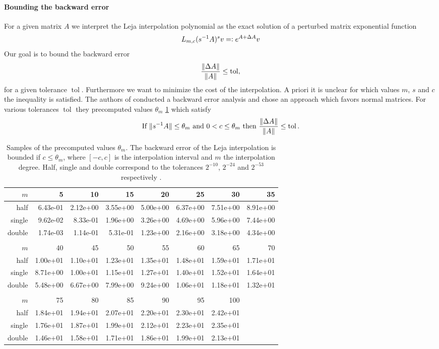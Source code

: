 \documentclass{scrartcl}
\newcommand{\eqdefn}{=\mathrel{\mathop:}}
\begin{document}
	\paragraph{Bounding the backward error} For a given matrix $A$ we interpret the Leja interpolation polynomial as the exact solution of a perturbed matrix exponential function
	\[
	L_{m,c}(s^{-1}A)^sv \eqdefn e^{A + \Delta A}v\\
	\]
	Our goal is to bound the backward error 
	\[
	\frac{\lVert\Delta A\rVert}{\lVert A\rVert} \le \operatorname{tol}, 
	\]
	for a given tolerance $\operatorname{tol}$. Furthermore we want to minimize the cost of the interpolation. A priori it is unclear for which values $m$, $s$ and $c$ the inequality is satisfied. The authors of \cite{lejarev} conducted a backward error analysis and chose an approach which favors normal matrices. For various tolerances $\operatorname{tol}$ they precomputed values $\theta_m$ \ref{table:thetam} which satisfy
	\[
	\text{If}\ \norm{s^{-1}A}\le \theta_m\ \text{and}\ 0 < c \le \theta_m\ \text{then}\ \frac{\norm{\Delta A}}{\norm{A}} \le \operatorname{tol}.
	\]
	\begin{table}[tbp]
		\begin{tabular}{r|rrrrrrr}
			$m$ &        5 &       10 &       15 &       20 &       25 &       30 &       35 \\\hline
			half & 6.43e-01 & 2.12e+00 & 3.55e+00 & 5.00e+00 & 6.37e+00 & 7.51e+00 & 8.91e+00 \\
			single & 9.62e-02 & 8.33e-01 & 1.96e+00 & 3.26e+00 & 4.69e+00 & 5.96e+00 & 7.44e+00 \\
			double & 1.74e-03 & 1.14e-01 & 5.31e-01 & 1.23e+00 & 2.16e+00 & 3.18e+00 & 4.34e+00 \\
			\\
			$m$ &       40 &       45 &       50 &       55 &       60 &       65 &       70 \\\hline
			half & 1.00e+01 & 1.10e+01 & 1.23e+01 & 1.35e+01 & 1.48e+01 & 1.59e+01 & 1.71e+01 \\
			single & 8.71e+00 & 1.00e+01 & 1.15e+01 & 1.27e+01 & 1.40e+01 & 1.52e+01 & 1.64e+01 \\
			double & 5.48e+00 & 6.67e+00 & 7.99e+00 & 9.24e+00 & 1.06e+01 & 1.18e+01 & 1.32e+01 \\
			\\
			$m$ &       75 &       80 &       85 &       90 &       95 &      100 \\ \hline
			half & 1.84e+01 & 1.94e+01 & 2.07e+01 & 2.20e+01 & 2.30e+01 & 2.42e+01 \\
			single & 1.76e+01 & 1.87e+01 & 1.99e+01 & 2.12e+01 & 2.23e+01 & 2.35e+01 \\
			double & 1.46e+01 & 1.58e+01 & 1.71e+01 & 1.86e+01 & 1.99e+01 & 2.13e+01
		\end{tabular}
		\caption{Samples of the precomputed values $\theta_m$. The backward error of the Leja interpolation is bounded if $c\le\theta_m$, where $[-c,c]$ is the interpolation interval and $m$ the interpolation degree. Half, single and double correspond to the tolerances $2^{-10}$, $2^{-24}$ and $2^{-53}$ respectively \cite[Table 1]{lejarev}.}
		\label{table:thetam}
	\end{table}	
\end{document}
